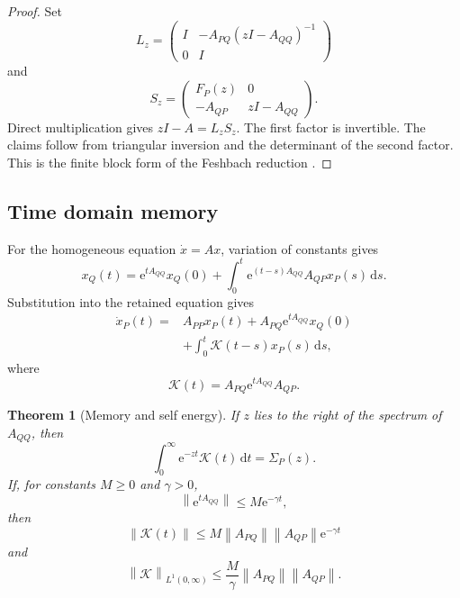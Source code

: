 \documentclass[11pt,a4paper]{article}
\newtheorem{theorem}{Theorem}[section]
\theoremstyle{definition}
\theoremstyle{remark}
\newcommand{\norm}[1]{\left\lVert#1\right\rVert}
\newcommand{\Kcal}{\mathcal K}
\newcommand{\e}{\mathrm e}
\newcommand{\dd}{\,\mathrm d}
\begin{document}
\begin{proof}
Set
\[
L_z=
\begin{pmatrix}
I&-A_{PQ}(zI-A_{QQ})^{-1}\\
0&I
\end{pmatrix}
\]
and
\[
S_z=
\begin{pmatrix}
F_P(z)&0\\
-A_{QP}&zI-A_{QQ}
\end{pmatrix}.
\]
Direct multiplication gives \(zI-A=L_zS_z\). The first factor is invertible. The claims follow from triangular inversion and the determinant of the second factor. This is the finite block form of the Feshbach reduction \cite{Feshbach1958}.
\end{proof}

\subsection{Time domain memory}

For the homogeneous equation \(\dot x=Ax\), variation of constants gives
\[
x_Q(t)
=
\e^{tA_{QQ}}x_Q(0)
+
\int_0^t
\e^{(t-s)A_{QQ}}A_{QP}x_P(s)
\dd s.
\]
Substitution into the retained equation gives
\[
\begin{aligned}
\dot x_P(t)
={}&
A_{PP}x_P(t)
+
A_{PQ}\e^{tA_{QQ}}x_Q(0)\\
&+
\int_0^t
\Kcal(t-s)x_P(s)
\dd s,
\end{aligned}
\]
where
\[
\Kcal(t)
=
A_{PQ}\e^{tA_{QQ}}A_{QP}.
\]

\begin{theorem}[Memory and self energy]\label{extended:record:086}\label{extended:thm:memory_self_energy}
If \(z\) lies to the right of the spectrum of \(A_{QQ}\), then
\[
\int_0^\infty
\e^{-zt}\Kcal(t)\dd t
=
\Sigma_P(z).
\]
If, for constants \(M\geq0\) and \(\gamma>0\),
\[
\norm{\e^{tA_{QQ}}}
\leq
M\e^{-\gamma t},
\]
then
\[
\norm{\Kcal(t)}
\leq
M\norm{A_{PQ}}\norm{A_{QP}}\e^{-\gamma t}
\]
and
\[
\norm{\Kcal}_{L^1(0,\infty)}
\leq
\frac{M}{\gamma}
\norm{A_{PQ}}\norm{A_{QP}}.
\]
\end{theorem}
\end{document}
